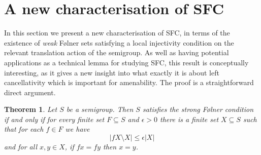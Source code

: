 \documentclass[11pt,a4paper,reqno]{amsart}
\newtheorem{theorem}{Theorem}[section]
\begin{document}
\section{A new characterisation of SFC}\label{sec_newsfc}

In this section we present a new characterisation of SFC, in terms of the existence of \textit{weak} F\o lner sets satisfying a local injectivity condition on the relevant translation action of the semigroup. As well as having potential applications as a technical lemma for studying SFC, this result is conceptually interesting, as it gives a new insight into what exactly it is about left cancellativity which is important for amenability.
The proof is a straightforward direct argument.

\begin{theorem}
Let $S$ be a semigroup. Then $S$ satisfies the strong F\o lner condition
if and only if for every finite set $F \subseteq S$ and $\epsilon > 0$ there is a finite set $X \subseteq S$ such that
for each $f \in F$ we have
$$|fX \setminus X| \leq \epsilon |X|$$ 
and for all $x,y \in X$, if $fx = fy$ then $x = y$.
\end{theorem}
\end{document}
